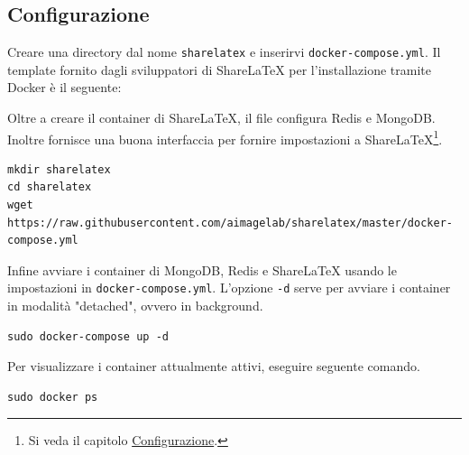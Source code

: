 \subsection{Configurazione}
Creare una directory dal nome \verb|sharelatex| e inserirvi \verb|docker-compose.yml|. Il template fornito dagli sviluppatori di ShareLaTeX per l'installazione tramite Docker è il seguente:

Oltre a creare il container di ShareLaTeX, il file configura Redis e MongoDB. Inoltre fornisce una buona interfaccia per fornire impostazioni a ShareLaTeX\footnote{Si veda il capitolo \href{Configurazione}{Configurazione}.}.
\begin{lstlisting}
mkdir sharelatex
cd sharelatex
wget https://raw.githubusercontent.com/aimagelab/sharelatex/master/docker-compose.yml
\end{lstlisting}
Infine avviare i container di MongoDB, Redis e ShareLaTeX usando le impostazioni in \verb|docker-compose.yml|. L'opzione \verb|-d| serve per avviare i container in modalità "detached", ovvero in background.
\begin{lstlisting}
sudo docker-compose up -d
\end{lstlisting}
Per visualizzare i container attualmente attivi, eseguire seguente comando.
\begin{lstlisting}
sudo docker ps
\end{lstlisting}